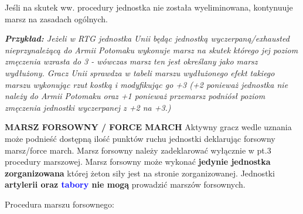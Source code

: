 Jeśli na skutek ww. procedury jednostka nie została wyeliminowana, kontynuuje marsz na zasadach ogólnych.\par
\textit{\textbf{Przykład:} Jeżeli w RTG jednostka Unii będąc jednostką wyczerpaną/exhausted nieprzynależącą do Armii Potomaku wykonuje marsz na skutek którego jej poziom zmęczenia wzrasta do 3 - wówczas marsz ten jest określany jako marsz wydłużony. Gracz Unii sprawdza w tabeli marszu wydłużonego efekt takiego marszu wykonując rzut kostką i modyfikując go +3 (+2 ponieważ jednostka nie należy do Armii Potomaku oraz +1 ponieważ przemarsz podniósł poziom zmęczenia jednostki wyczerpanej z +2 na +3.)}

\bigbreak
\textbf{MARSZ FORSOWNY / FORCE MARCH}
\bigbreak
Aktywny gracz wedle uznania może podnieść dostępną ilość punktów ruchu jednostki deklarując forsowny marsz/force march.
Marsz forsowny należy zadeklarować wyłącznie w pt.3 procedury marszowej.
Marsz forsowny może wykonać \textbf{jedynie jednostka zorganizowana} której żeton siły jest na stronie zorganizowanej.
Jednostki \textbf{artylerii oraz \textcolor{blue}{tabory} nie mogą} prowadzić marszów forsownych.\par
Procedura marszu forsownego:
